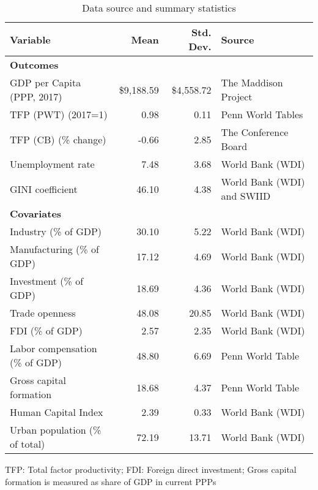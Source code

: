 \begin{table}[!htbp]
\begin{center}
\caption{Data source and summary statistics} \label{table:sources}
\begin{tabular}{l r r l} \\ \toprule
  Variable                       & Mean    & Std. Dev.     & Source                     \\ \midrule
  \textbf{Outcomes}              &         &               &                            \\
  GDP per Capita (PPP, 2017)     & \$9,188.59 & \$4,558.72 & The Maddison Project       \\
  TFP (PWT) (2017=1)             & 0.98    & 0.11          & Penn World Tables          \\
  TFP (CB) (\% change)           & -0.66   & 2.85          & The Conference Board       \\
  Unemployment rate              & 7.48    & 3.68          & World Bank (WDI)           \\
  GINI coefficient               & 46.10   & 4.38          & World Bank (WDI) and SWIID \\ \midrule
  \textbf{Covariates}            &         &               &                            \\
  Industry (\% of GDP)           & 30.10   & 5.22          & World Bank (WDI)           \\
  Manufacturing (\% of GDP)      & 17.12   & 4.69          & World Bank (WDI)           \\
  Investment (\% of GDP)         & 18.69   & 4.36          & World Bank (WDI)           \\
  Trade openness                 & 48.08   & 20.85         & World Bank (WDI)           \\
  FDI (\% of GDP)                & 2.57    & 2.35          & World Bank (WDI)           \\
  Labor compensation (\% of GDP) & 48.80   & 6.69          & Penn World Table           \\
  Gross capital formation        & 18.68   & 4.37          & Penn World Table           \\
  Human Capital Index            & 2.39    & 0.33          & World Bank (WDI)           \\
  Urban population (\% of total) & 72.19   & 13.71         & World Bank (WDI)           \\
  \bottomrule 
\end{tabular}
\singlespacing \footnotesize \raggedright
TFP: Total factor productivity; FDI: Foreign direct investment; Gross capital formation is measured as share of GDP in current PPPs
\end{center}
\end{table}
